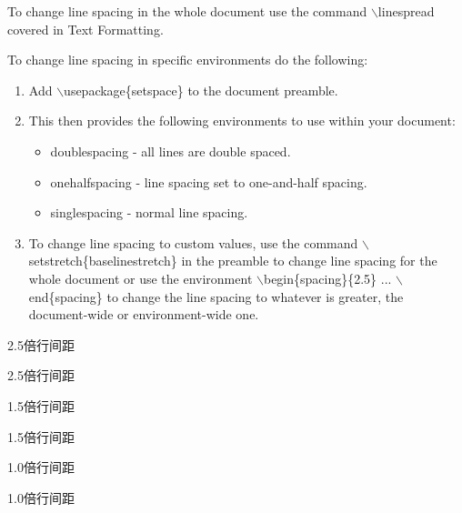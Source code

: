 \documentclass{ctexart}
\begin{document}
To change line spacing in the whole document use the command  $\backslash$linespread covered in Text Formatting.

To change line spacing in specific environments do the following:
\begin{enumerate}
\item Add $\backslash$usepackage\{setspace\} to the document preamble.
\item This then provides the following environments to use within your document:
    \begin{itemize}
      \item doublespacing - all lines are double spaced.
      \item onehalfspacing - line spacing set to one-and-half spacing.
      \item singlespacing - normal line spacing.
    \end{itemize}
\item To change line spacing to custom values, use the command $\backslash$setstretch\{baselinestretch\} in the preamble to change line spacing for the whole document or use the environment $\backslash$begin\{spacing\}\{2.5\} ... $\backslash$end\{spacing\} to change the line spacing to whatever is greater, the document-wide or environment-wide one.
\end{enumerate}

\begin{spacing}{2.5}
2.5倍行间距

2.5倍行间距
\end{spacing}

1.5倍行间距

1.5倍行间距

\singlespacing
1.0倍行间距

1.0倍行间距
\end{document}
